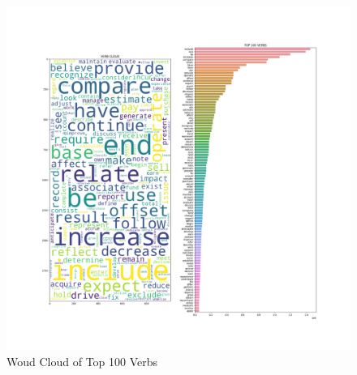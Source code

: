 \begin{figure}[!tbp]
    \includegraphics[width=\textwidth]{figures/VERB_top100_figure.png}
    \caption{Woud Cloud of Top 100 Verbs}
    \label{fig:VERB}
\end{figure}

